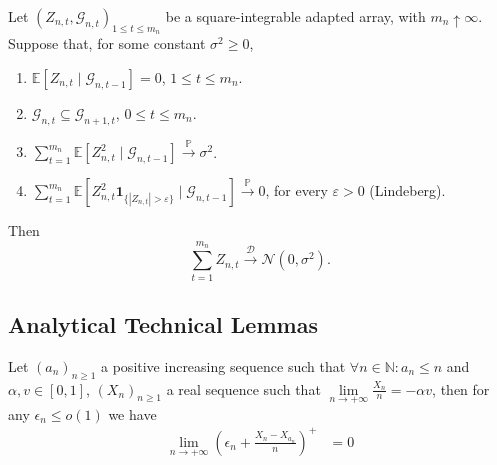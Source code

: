 {\color{revisiongreen}
\begin{lemma}
\label{lem:hall-heyde-clt}
Let \((Z_{n,t},\mathcal{G}_{n,t})_{1\leq t\leq m_n}\) be a
square-integrable adapted array, with \(m_n\uparrow\infty\).
Suppose that, for some constant \(\sigma^2\geq0\),
\begin{enumerate}[label=(\roman*)]
\item \(\mathbb{E}[Z_{n,t}\mid\mathcal{G}_{n,t-1}]=0\), \(1\leq t\leq m_n\).
\item \(\mathcal{G}_{n,t}\subseteq\mathcal{G}_{n+1,t}\), \(0\leq t\leq m_n\).
\item \(\sum_{t=1}^{m_n}\mathbb{E}[Z_{n,t}^2\mid\mathcal{G}_{n,t-1}]\xrightarrow{\mathbb P}\sigma^2\).
\item \(\sum_{t=1}^{m_n}\mathbb{E}[Z_{n,t}^2\mathbf{1}_{\{|Z_{n,t}|>\varepsilon\}}\mid\mathcal{G}_{n,t-1}]\xrightarrow{\mathbb P}0\), for every \(\varepsilon>0\) (Lindeberg).
\end{enumerate}
Then
\[
\sum_{t=1}^{m_n}Z_{n,t}
\xrightarrow{\mathcal D}\mathcal N(0,\sigma^2).
\]
\end{lemma}
}

\subsection{Analytical Technical Lemmas}
\begin{lemma}\label{lem:convergence}
	Let $(a_n)_{n \geq 1}$ a positive increasing sequence such that $\forall n \in \mathbb{N}: a_n \leq n$ and $\alpha, v \in [0,1]$, $(X_n)_{n \geq 1}$ a real sequence such that $\lim\limits_{n \to +\infty} \frac{X_n}{n} = -\alpha v$, then for any \(\epsilon_n \leq o(1)\) we have
\begin{align*}
		\lim\limits_{n \to +\infty}\left( \epsilon_n + \frac{X_n - X_{a_n}}{n} \right)^+ &= 0 
\end{align*}
\end{lemma}

